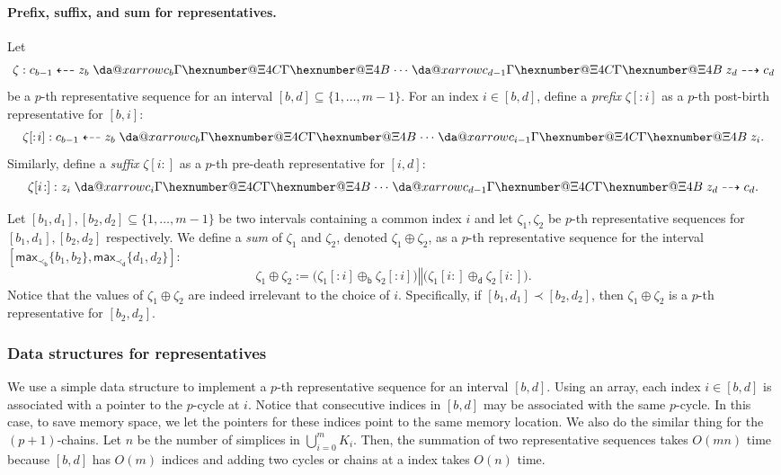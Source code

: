 \documentclass[letterpaper,11pt]{article}
\makeatletter
\theoremstyle{mythmstyle}
\theoremstyle{mydefstyle}
\theoremstyle{plain}
\theoremstyle{definition}
\newcommand{\<}[1]{\langle #1\rangle}
\newcommand{\Set}[1]{\{#1\}}
\newcommand{\Max}{\mathsf{max}}
\let\bigunion\bigcup
\newcommand{\Dim}{p}
\newcommand{\filtcnt}{m}
\newcommand{\simpcnt}{n}
\newcommand{\bles}{\prec_{\mathsf{b}}}
\newcommand{\dles}{\prec_{\mathsf{d}}}
\newcommand{\iles}{\prec}
\newcommand{\brepsum}{\oplus_{\mathsf{b}}}
\newcommand{\drepsum}{\oplus_{\mathsf{d}}}
\newcommand{\repsum}{\oplus}
\newcommand{\cyc}{z}
\newcommand{\chn}{c}
\newcommand{\rseq}{\zeta}
\newcommand{\rconcat}{\mathbin\Vert}
\newcommand{\rsprefix}[1]{{[:\!#1]}}
\newcommand{\rssuffix}[1]{{[#1\!:]}}
\newcommand*{\da@rightarrow}{\mathchar"0\hexnumber@\symAMSa 4B }
\newcommand*{\da@leftarrow}{\mathchar"0\hexnumber@\symAMSa 4C }
\newcommand{\xdashleftrightarrow}[2][]{%
  \mathrel{%
    \mathpalette{\da@xarrow{#1}{#2}\da@leftarrow\da@rightarrow{}{}}{}%
  }%
}
\newcommand*{\da@xarrow}[7]{%
  \sbox0{$\ifx#7\scriptstyle\scriptscriptstyle\else\scriptstyle\fi#5#1#6\m@th$}%
  \sbox2{$\ifx#7\scriptstyle\scriptscriptstyle\else\scriptstyle\fi#5#2#6\m@th$}%
  \sbox4{$#7\dabar@\m@th$}%
  \dimen@=\wd0 %
  \ifdim\wd2 >\dimen@
    \dimen@=\wd2 %
  \fi
  \count@=2 %
  \def\da@bars{\dabar@\dabar@}%
  \@whiledim\count@\wd4<\dimen@\do{%
    \advance\count@\@ne
    \expandafter\def\expandafter\da@bars\expandafter{%
      \da@bars
      \dabar@ 
    }%
  }%
  \mathrel{#3}%
  \mathrel{%
    \mathop{\da@bars}\limits
    \ifx\\#1\\%
    \else
      _{\copy0}%
    \fi
    \ifx\\#2\\%
    \else
      ^{\copy2}%
    \fi
  }%
  \mathrel{#4}%
  \!\!
}
\let\rseqlrarr\xdashleftrightarrow
\makeatother
\begin{document}
\paragraph{Prefix, suffix, and sum for representatives.}
Let 
\[\rseq:\chn_{b-1}\dashleftarrow\cyc_{b}\rseqlrarr{\chn_{b}}\cdots
\rseqlrarr{\chn_{d-1}}\cyc_{d}\dashrightarrow\chn_{d}\]
be a $\Dim$-th representative sequence for an interval 
$[b,d]\subseteq\Set{1,\ldots,\filtcnt-1}$. For an index $i\in[b,d]$,
define a {\it prefix} $\rseq\rsprefix{i}$ as
a $\Dim$-th post-birth representative for $[b,i]$:
\[\rseq\rsprefix{i}:\chn_{b-1}\dashleftarrow\cyc_{b}\rseqlrarr{\chn_{b}}\cdots
\rseqlrarr{\chn_{i-1}}\cyc_{i}.\]
Similarly, define a {\it suffix} $\rseq\rssuffix{i}$ as
a $\Dim$-th pre-death representative for $[i,d]$:
\[\rseq\rssuffix{i}:\cyc_{i}\rseqlrarr{\chn_{i}}\cdots
\rseqlrarr{\chn_{d-1}}\cyc_{d}\dashrightarrow\chn_{d}.\]

Let $[b_1,d_1],[b_2,d_2]\subseteq\Set{1,\ldots,\filtcnt-1}$ 
be two intervals containing a common index $i$
and let $\rseq_1,\rseq_2$
be $\Dim$-th representative sequences for $[b_1,d_1],[b_2,d_2]$
respectively.
We define a \emph{sum} of $\rseq_1$ and $\rseq_2$, denoted $\rseq_1\repsum\rseq_2$,
as a $\Dim$-th representative sequence for the interval 
$[\Max_{\bles}\Set{b_1,b_2},\Max_{\dles}\Set{d_1,d_2}]$:
\[\rseq_1\repsum\rseq_2:=\big(\rseq_1\rsprefix{i}\brepsum\rseq_2\rsprefix{i}\big)
\rconcat\big(\rseq_1\rssuffix{i}\drepsum\rseq_2\rssuffix{i}\big).\]
Notice that the values of $\rseq_1\repsum\rseq_2$ are indeed irrelevant to the choice of $i$.
Specifically, if $[b_1,d_1]\iles [b_2,d_2]$,
then $\rseq_1\repsum\rseq_2$ is a $\Dim$-th representative
for $[b_2,d_2]$.

\subsubsection{Data structures for representatives}

We use a simple data structure to implement
a $\Dim$-th representative sequence
for an interval $[b,d]$. Using an array,
each index $i\in[b,d]$ is associated with a pointer 
to the $\Dim$-cycle at $i$. 
Notice that consecutive indices in $[b,d]$ may be associated with
the same $\Dim$-cycle. In this case, to save memory space, 
we let the pointers for these indices point to the same 
memory location.
We also do the similar thing for the $(\Dim+1)$-chains.
Let $\simpcnt$ be the number of simplices in $\bigunion_{i=0}^\filtcnt K_i$.
Then, the summation of two representative sequences takes $O(\filtcnt\simpcnt)$ time
because $[b,d]$ has $O(\filtcnt)$ indices
and adding two cycles or chains at a index
takes $O(\simpcnt)$ time.
\end{document}
